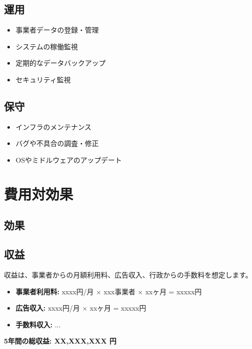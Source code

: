 \documentclass[a4j, 11pt, report]{jsarticle}
\begin{document}
\subsection{運用}
\begin{itemize}
    \item 事業者データの登録・管理 
    \item システムの稼働監視 
    \item 定期的なデータバックアップ 
    \item セキュリティ監視
\end{itemize}

\subsection{保守}
\begin{itemize}
    \item インフラのメンテナンス 
    \item バグや不具合の調査・修正 
    \item OSやミドルウェアのアップデート 
\end{itemize}

\section{費用対効果}
\subsection{効果}


\subsection{収益}
収益は、事業者からの月額利用料、広告収入、行政からの手数料を想定します。
\begin{itemize}
    \item \textbf{事業者利用料:} xxxx円/月 $\times$ xxx事業者 $\times$ xxヶ月 = xxxxx円
    \item \textbf{広告収入:} xxxx円/月 $\times$ xxヶ月 = xxxxx円
    \item \textbf{手数料収入:} ...
\end{itemize}
\textbf{5年間の総収益: XX,XXX,XXX 円}
\end{document}
